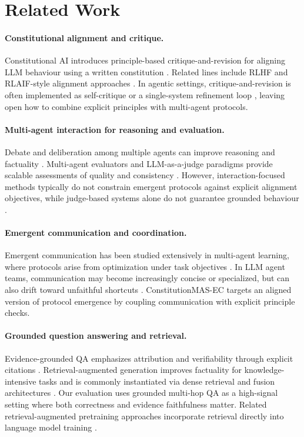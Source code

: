\documentclass{article}
\newcommand{\framework}{ConstitutionMAS-EC\xspace}
\theoremstyle{plain}
\theoremstyle{definition}
\begin{document}
\section{Related Work}
\paragraph{Constitutional alignment and critique.}
Constitutional AI introduces principle-based critique-and-revision for aligning LLM behaviour using a written constitution \citep{bai2022constitutional}. Related lines include RLHF and RLAIF-style alignment approaches \citep{christiano2017deep,ouyang2022training,lee2023rlaif}. In agentic settings, critique-and-revision is often implemented as self-critique or a single-system refinement loop \citep{madaan2023selfrefine,shinn2023reflexion}, leaving open how to combine explicit principles with multi-agent protocols.

\paragraph{Multi-agent interaction for reasoning and evaluation.}
Debate and deliberation among multiple agents can improve reasoning and factuality \citep{du2024debate,chan2023chateval}. Multi-agent evaluators and LLM-as-a-judge paradigms provide scalable assessments of quality and consistency \citep{zheng2023judging,liu2023geval}. However, interaction-focused methods typically do not constrain emergent protocols against explicit alignment objectives, while judge-based systems alone do not guarantee grounded behaviour \citep{wang2023surveyjudge}.

\paragraph{Emergent communication and coordination.}
Emergent communication has been studied extensively in multi-agent learning, where protocols arise from optimization under task objectives \citep{sukhbaatar2016commnet,foerster2016learning,lazaridou2017multi}. In LLM agent teams, communication may become increasingly concise or specialized, but can also drift toward unfaithful shortcuts \citep{park2023generative,wu2023autogen}. \framework targets an aligned version of protocol emergence by coupling communication with explicit principle checks.

\paragraph{Grounded question answering and retrieval.}
Evidence-grounded QA emphasizes attribution and verifiability through explicit citations \citep{yang2018hotpotqa,thorne2018fever}. Retrieval-augmented generation improves factuality for knowledge-intensive tasks \citep{lewis2020rag} and is commonly instantiated via dense retrieval \citep{karpukhin2020dpr} and fusion architectures \citep{izacard2021fid}. Our evaluation uses grounded multi-hop QA as a high-signal setting where both correctness and evidence faithfulness matter.
Related retrieval-augmented pretraining approaches incorporate retrieval directly into language model training \citep{guu2020realm}.
\end{document}
